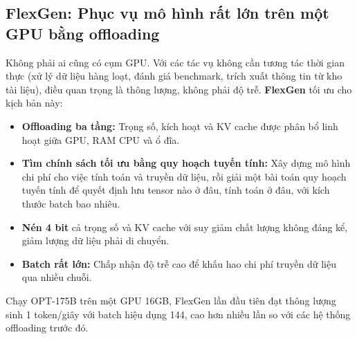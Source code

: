 \subsection{FlexGen: Phục vụ mô hình rất lớn trên một GPU bằng offloading}
\label{ssec:flexgen}
Không phải ai cũng có cụm GPU. Với các tác vụ không cần tương tác thời gian thực (xử lý dữ liệu hàng loạt, đánh giá benchmark, trích xuất thông tin từ kho tài liệu), điều quan trọng là thông lượng, không phải độ trễ. \textbf{FlexGen} \cite{sheng2023flexgen} tối ưu cho kịch bản này:
\begin{itemize}
	\item \textbf{Offloading ba tầng:} Trọng số, kích hoạt và KV cache được phân bổ linh hoạt giữa GPU, RAM CPU và ổ đĩa.
	\item \textbf{Tìm chính sách tối ưu bằng quy hoạch tuyến tính:} Xây dựng mô hình chi phí cho việc tính toán và truyền dữ liệu, rồi giải một bài toán quy hoạch tuyến tính để quyết định lưu tensor nào ở đâu, tính toán ở đâu, với kích thước batch bao nhiêu.
	\item \textbf{Nén 4 bit} cả trọng số và KV cache với suy giảm chất lượng không đáng kể, giảm lượng dữ liệu phải di chuyển.
	\item \textbf{Batch rất lớn:} Chấp nhận độ trễ cao để khấu hao chi phí truyền dữ liệu qua nhiều chuỗi.
\end{itemize}
Chạy OPT-175B trên một GPU 16GB, FlexGen lần đầu tiên đạt thông lượng sinh 1 token/giây với batch hiệu dụng 144, cao hơn nhiều lần so với các hệ thống offloading trước đó.
